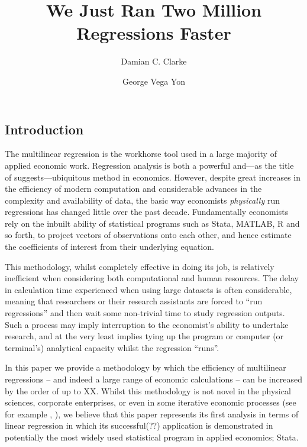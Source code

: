 \documentclass{article}[11pt,subeqn]
\title{We Just Ran Two Million Regressions Faster}
\author{Damian C. Clarke \and George Vega Yon}
\begin{document}
\begin{spacing}{1.25}

\maketitle

\begin{abstract}

\end{abstract}

\section{Introduction}
The multilinear regression is the workhorse tool used in a large majority of applied economic work.  Regression analysis is both a powerful and---as the 
title of \citet{SalaiMartin1997} suggests---ubiquitous method in economics.  However, despite great increases in the efficiency of modern computation and
considerable advances in the complexity and availability of data, the basic way economists \emph{physically} run regressions has changed little over
the past decade.  Fundamentally economists rely on the inbuilt ability of statistical programs such as Stata, MATLAB, R and so forth, to project vectors
of observations onto each other, and hence estimate the coefficients of interest from their underlying equation.

This methodology, whilst completely effective in doing its job, is relatively inefficient when considering both computational and human resources.  The
delay in calculation time experienced when using large datasets is often considerable, meaning that researchers or their research assistants are forced
to ``run regressions'' and then wait some non-trivial time to study regression outputs.  Such a process may imply interruption to the economist's ability 
to undertake research, and at the very least implies tying up the program or computer (or terminal's) analytical capacity whilst the regression ``runs''.  

In this paper we provide a methodology by which the efficiency of multilinear regressions -- and indeed a large range of economic calculations -- can be
increased by the order of up to XX.  Whilst this methodology is not novel in the physical sciences, corporate enterprises, or even in some iterative economic
processes (see for example \citeauthor{aldrich2011}, \citeyear{aldrich2011}), we believe that this paper represents its first analysis in terms of linear 
regression in which its successful(??) application is demonstrated in potentially the most widely used statistical program in applied economics; Stata.  


\end{spacing}
\end{document}
